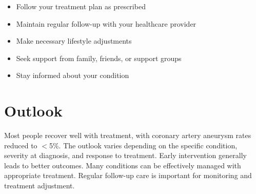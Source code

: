 \begin{itemize}[noitemsep]
  \item Follow your treatment plan as prescribed
  \item Maintain regular follow-up with your healthcare provider
  \item Make necessary lifestyle adjustments
  \item Seek support from family, friends, or support groups
  \item Stay informed about your condition
\end{itemize}
\section{Outlook}
Most people recover well with treatment, with coronary artery aneurysm rates reduced to $<$5\%. The outlook varies depending on the specific condition, severity at diagnosis, and response to treatment. Early intervention generally leads to better outcomes. Many conditions can be effectively managed with appropriate treatment. Regular follow-up care is important for monitoring and treatment adjustment.
